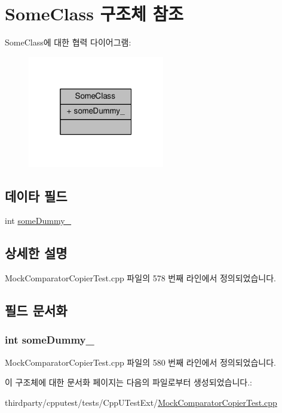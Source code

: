 \hypertarget{struct_some_class}{}\section{Some\+Class 구조체 참조}
\label{struct_some_class}


Some\+Class에 대한 협력 다이어그램\+:
\nopagebreak
\begin{figure}[H]
\begin{center}
\leavevmode
\includegraphics[width=169pt]{struct_some_class__coll__graph}
\end{center}
\end{figure}
\subsection*{데이타 필드}
\begin{DoxyCompactItemize}
\item 
int \hyperlink{struct_some_class_a4df4d16e88d5dcdf17ec737cba483035}{some\+Dummy\+\_\+}
\end{DoxyCompactItemize}


\subsection{상세한 설명}


Mock\+Comparator\+Copier\+Test.\+cpp 파일의 578 번째 라인에서 정의되었습니다.



\subsection{필드 문서화}
\subsubsection[{\texorpdfstring{some\+Dummy\+\_\+}{someDummy_}}]{\setlength{\rightskip}{0pt plus 5cm}int some\+Dummy\+\_\+}\hypertarget{struct_some_class_a4df4d16e88d5dcdf17ec737cba483035}{}\label{struct_some_class_a4df4d16e88d5dcdf17ec737cba483035}


Mock\+Comparator\+Copier\+Test.\+cpp 파일의 580 번째 라인에서 정의되었습니다.



이 구조체에 대한 문서화 페이지는 다음의 파일로부터 생성되었습니다.\+:\begin{DoxyCompactItemize}
\item 
thirdparty/cpputest/tests/\+Cpp\+U\+Test\+Ext/\hyperlink{_mock_comparator_copier_test_8cpp}{Mock\+Comparator\+Copier\+Test.\+cpp}\end{DoxyCompactItemize}
